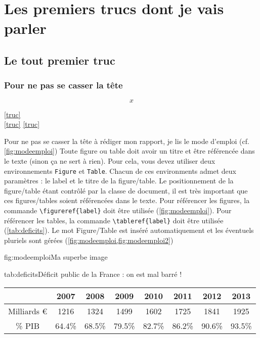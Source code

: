 \documentclass[overfullbox]{polytech}
\begin{document}
\lipsum[1-3]


\part{Les premiers trucs dont je vais parler}
\label{part:premierstrucs}

\chapter{Le tout premier truc}
\label{chap:toutpremier}

\lipsum[1]


\section{Pour ne pas se casser la tête}

\label{sec:cassetete}


\begin{equation}
\label{truc}
x
\end{equation}

\autoref{truc}\\
\ref{truc}
\eqref{truc}

Pour ne pas se casser la tête à rédiger mon rapport, je lis le mode d'emploi (cf. \ref{fig:modeemploi})
Toute figure ou table doit avoir un titre et être référencée dans le texte (sinon ça ne sert à rien).
Pour cela, vous devez utiliser deux environnements \texttt{Figure} et \texttt{Table}. Chacun de ces environments admet deux paramètres : le label et le titre de la figure/table. Le positionnement de la figure/table étant contrôlé par la classe de document, il est très important que ces figures/tables soient référencées dans le texte. Pour référencer les figures, la commande \texttt{\textbackslash{}figureref\{label\}} doit être utilisée (\ref{fig:modeemploi}).
Pour référencer les tables, la commande \texttt{\textbackslash{}tableref\{label\}} doit être utilisée (\ref{tab:deficits}). Le mot Figure/Table est inséré automatiquement et les éventuels pluriels sont gérées (\ref{fig:modeemploi,fig:modeemploi2})

\begin{Figure}{fig:modeemploi}{Ma superbe image}
\end{Figure}

\begin{Table}{tab:deficits}{Déficit public de la France : on est mal barré !}
\begin{tabu}{cccccccc}
	&2007	&2008	&2009	&2010	&2011	&2012	&2013\\\hline
Milliards \euro&1216	&1324	&1499	&1602	&1725	&1841	&1925\\\hline
\% PIB	&64.4\%	&68.5\%	&79.5\%	&82.7\%	&86.2\%	&90.6\%	&93.5\%\\\hline
\end{tabu}
\end{Table}
\end{document}
